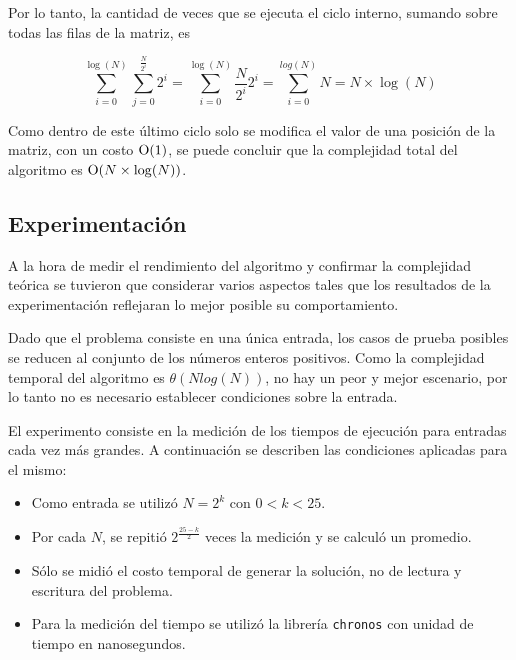       Por lo tanto, la cantidad de veces que se ejecuta el ciclo interno, sumando sobre todas las filas de la matriz, es

      \[\sum_{i = 0}^{\log(N)} \sum_{j = 0}^{\frac{N}{2^i}} 2^i = \sum_{i = 0}^{\log(N)} \frac{N}{2^i} 2^i = \sum_{i = 0}^{log(N)} N = N \times \log(N)\]

      Como dentro de este último ciclo solo se modifica el valor de una posición de la matriz, con un costo $\operatorname{O}(1)$, se puede concluir que la complejidad total del algoritmo es $\operatorname{O}(N \times \log(N))$. 



    \subsection{Experimentación}

	A la hora de medir el rendimiento del algoritmo y confirmar la complejidad
	teórica se tuvieron que considerar varios aspectos tales que los
	resultados de la experimentación reflejaran lo mejor posible su
	comportamiento.

	Dado que el problema consiste en una única entrada, los casos de prueba
	posibles se reducen al conjunto de los números enteros positivos. Como la
	complejidad temporal del algoritmo es $\theta(Nlog(N))$, no hay un peor
	y mejor escenario, por lo tanto no es necesario establecer condiciones sobre
	la entrada.

	El experimento consiste en la medición de los tiempos de ejecución para
	entradas cada vez más grandes. A continuación se describen las condiciones aplicadas
	para el mismo:

	\begin{itemize}
		\item{Como entrada se utilizó $N = 2^{k}$ con $0 < k < 25.$}
		\item{Por cada $N$, se repitió $2^{\frac{25 - k}{2}}$ veces la medición y se calculó un
			promedio.}
		\item{Sólo se midió el costo temporal de generar la solución, no
			de lectura y escritura del problema.}
		\item{Para la medición del tiempo se utilizó la librería \texttt{chronos}
			con unidad de tiempo en nanosegundos.}
	\end{itemize}

